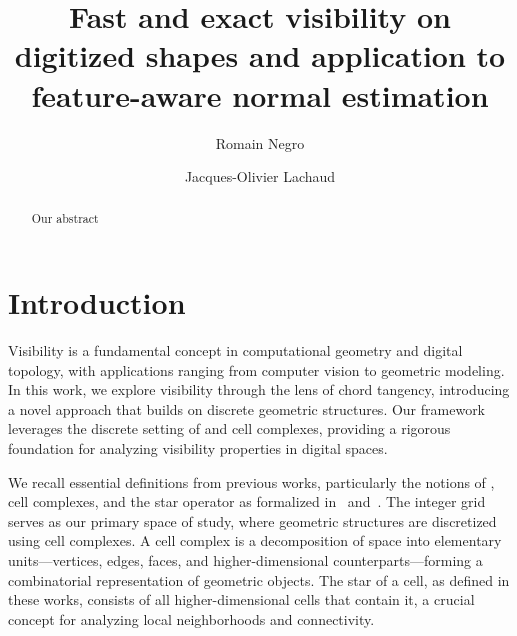 \documentclass[runningheads]{llncs}
\begin{document}
%
    \title{Fast and exact visibility on digitized shapes and application to feature-aware normal estimation}
%
%
    \author{Romain Negro \and
    Jacques-Olivier Lachaud}
%
%
%
    \maketitle              %
%
    \begin{abstract}
        Our abstract
    \end{abstract}



    \section{Introduction}


    Visibility is a fundamental concept in computational geometry and digital topology, with applications ranging from computer vision to geometric modeling.
    In this work, we explore visibility through the lens of chord tangency, introducing a novel approach that builds on discrete geometric structures.
    Our framework leverages the discrete setting of and cell complexes, providing a rigorous foundation for analyzing visibility properties in digital spaces.

    We recall essential definitions from previous works, particularly the notions of , cell complexes, and the star operator as formalized in~\cite{lachaud:2021-dgmm} and~\cite{lachaud:2022-jmiv}.
    The integer grid serves as our primary space of study, where geometric structures are discretized using cell complexes.
    A cell complex is a decomposition of space into elementary units—vertices, edges, faces, and higher-dimensional counterparts—forming a combinatorial representation of geometric objects.
    The star of a cell, as defined in these works, consists of all higher-dimensional cells that contain it, a crucial concept for analyzing local neighborhoods and connectivity.
\end{document}
